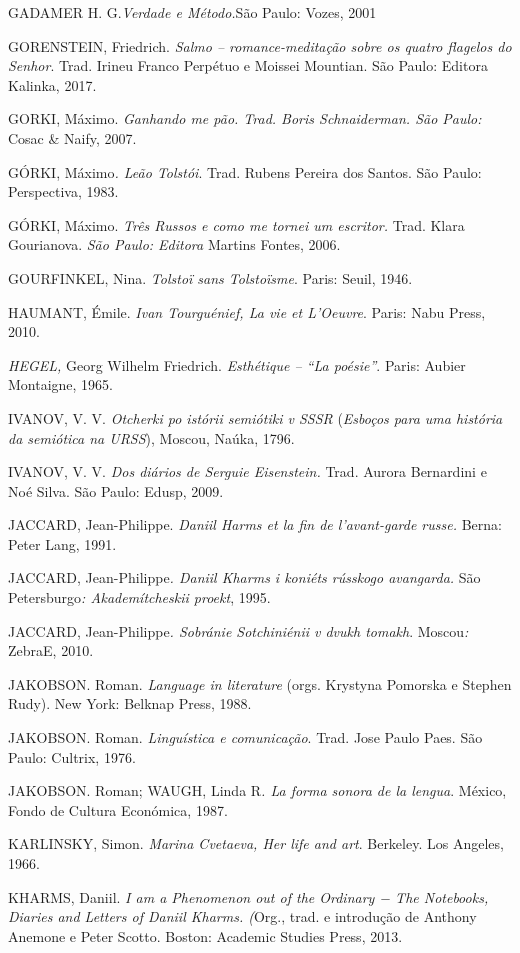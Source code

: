 GADAMER H. G.\emph{Verdade e Método.}São Paulo: Vozes, 2001

GORENSTEIN, Friedrich. \emph{Salmo -- romance-meditação sobre os quatro
flagelos do Senhor}. Trad. Irineu Franco Perpétuo e Moissei Mountian.
São Paulo: Editora Kalinka, 2017.

GORKI, Máximo. \emph{Ganhando me pão. Trad. Boris Schnaiderman. São
Paulo:} Cosac \& Naify, 2007.

GÓRKI, Máximo\emph{. Leão Tolstói}. Trad. Rubens Pereira dos Santos. São
Paulo: Perspectiva, 1983.

GÓRKI, Máximo. \emph{Três Russos e como me tornei um escritor.} Trad.
Klara Gourianova. \emph{São Paulo: Editora} Martins Fontes, 2006.

GOURFINKEL, Nina. \emph{Tolstoï sans Tolstoïsme}. Paris: Seuil, 1946.

HAUMANT, Émile. \emph{Ivan Tourguénief, La vie et L'Oeuvre}. Paris: Nabu
Press, 2010.

\emph{HEGEL,} Georg Wilhelm Friedrich. \emph{Esthétique -- ``La
poésie''}. Paris: Aubier Montaigne, 1965.

IVANOV, V. V. \emph{Otcherki po istórii semiótiki v SSSR} (\emph{Esboços
para uma história da semiótica na URSS}), Moscou, Naúka, 1796.

IVANOV, V. V. \emph{Dos diários de Serguie Eisenstein.} Trad. Aurora
Bernardini e Noé Silva. São Paulo: Edusp, 2009.

JACCARD, Jean-Philippe. \emph{Daniil Harms et la fin de l'avant-garde
russe.} Berna: Peter Lang, 1991.

JACCARD, Jean-Philippe\emph{. Daniil Kharms i koniéts rússkogo
avangarda.} São Petersburgo\emph{: Akademítcheskii proekt}, 1995.

JACCARD, Jean-Philippe\emph{. Sobránie Sotchiniénii v dvukh tomakh}.
Moscou\emph{:} ZebraE, 2010.

JAKOBSON. Roman. \emph{Language in literature} (orgs. Krystyna Pomorska
e Stephen Rudy). New York: Belknap Press, 1988.

JAKOBSON. Roman. \emph{Linguística e comunicação}. Trad. Jose Paulo
Paes. São Paulo: Cultrix, 1976.

JAKOBSON. Roman; WAUGH, Linda R\emph{. La forma sonora de la lengua}.
México, Fondo de Cultura Económica, 1987.

KARLINSKY, Simon. \emph{Marina Cvetaeva, Her life and art}. Berkeley.
Los Angeles, 1966.

KHARMS, Daniil. \emph{I am a Phenomenon out of the Ordinary − The
Notebooks, Diaries and Letters of Daniil Kharms. (}Org., trad. e
introdução de Anthony Anemone e Peter Scotto. Boston: Academic Studies
Press, 2013.

